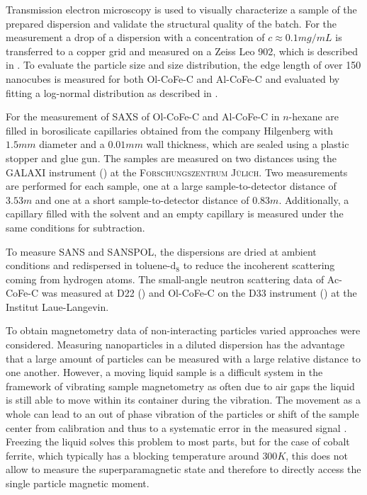 \documentclass[\main/dresen_thesis.tex]{subfiles}
\begin{document}
  \label{sec:monolayers:nanoparticle:structuralCharacterization}

    Transmission electron microscopy is used to visually characterize a sample of the prepared dispersion and validate the structural quality of the batch.
    For the measurement a drop of a dispersion with a concentration of $c \approx 0.1 \unit{mg/mL}$ is transferred to a copper grid and measured on a Zeiss Leo 902, which is described in .
    To evaluate the particle size and size distribution, the edge length of over 150 nanocubes is measured for both Ol-CoFe-C and Al-CoFe-C and evaluated by fitting a log-normal distribution as described in .

    For the measurement of SAXS of Ol-CoFe-C and Al-CoFe-C in $\textit{n}$-hexane are filled in borosilicate capillaries obtained from the company Hilgenberg with $1.5 \unit{mm}$ diameter and a $0.01 \unit{mm}$ wall thickness, which are sealed using a plastic stopper and glue gun.
    The samples are measured on two distances using the GALAXI instrument () at the \textsc{Forschungszentrum J\"ulich}. 
    Two measurements are performed for each sample, one at a large sample-to-detector distance of $3.53 \unit{m}$ and one at a short sample-to-detector distance of $0.83 \unit{m}$.
    Additionally, a capillary filled with the solvent and an empty capillary is measured under the same conditions for subtraction.

    To measure SANS and SANSPOL, the dispersions are dried at ambient conditions and redispersed in toluene-$\mathrm{d_8}$ to reduce the incoherent scattering coming from hydrogen atoms.
    The small-angle neutron scattering data of Ac-CoFe-C was measured at D22 () and Ol-CoFe-C on the D33 instrument () at the Institut Laue-Langevin.

    To obtain magnetometry data of non-interacting particles varied approaches were considered.
    Measuring nanoparticles in a diluted dispersion has the advantage that a large amount of particles can be measured with a large relative distance to one another.
    However, a moving liquid sample is a difficult system in the framework of vibrating sample magnetometry as often due to air gaps the liquid is still able to move within its container during the vibration.
    The movement as a whole can lead to an out of phase vibration of the particles or shift of the sample center from calibration and thus to a systematic error in the measured signal \cite{Boekelheide_2016_Artif}.
    Freezing the liquid solves this problem to most parts, but for the case of cobalt ferrite, which typically has a blocking temperature around $300 \unit{K}$, this does not allow to measure the superparamagnetic state and therefore to directly access the single particle magnetic moment.
\end{document}
